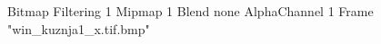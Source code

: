 {Bitmap
	{Filtering 1}
	{Mipmap 1}
	{Blend none}
	{AlphaChannel 1}
	{Frame "win_kuznja1_x.tif.bmp"}
}

